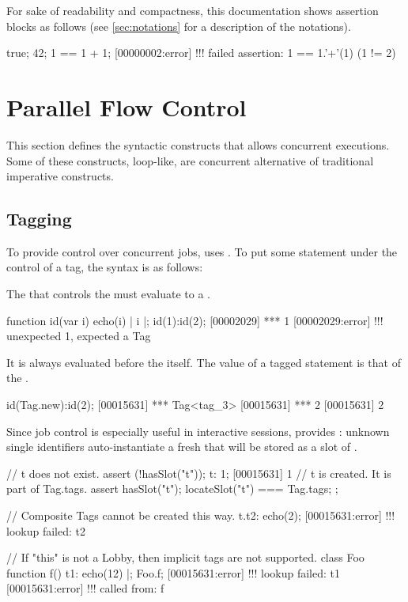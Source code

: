 For sake of readability and compactness, this documentation shows assertion
blocks as follows (see \autoref{sec:notations} for a description of the
notations).

\begin{urbiassert}
true;
42;
1 == 1 + 1;
[00000002:error] !!! failed assertion: 1 == 1.'+'(1) (1 != 2)
\end{urbiassert}


\section{Parallel Flow Control}
\label{sec:lang:conc}
This section defines the syntactic constructs that allows concurrent
executions.  Some of these constructs, loop-like, are concurrent alternative
of traditional imperative constructs.

\subsection{Tagging}
\label{sec:lang:tag}
To provide control over concurrent jobs, \us uses .  To
put some statement under the control of a tag, the syntax is as follows:


The  that controls the  must evaluate to a
.

\begin{urbiscript}
function id(var i) { echo(i) | i }|;
id(1):id(2);
[00002029] *** 1
[00002029:error] !!! unexpected 1, expected a Tag
\end{urbiscript}

It is always evaluated before the  itself.  The value of a
tagged statement is that of the .
\begin{urbiscript}
id(Tag.new):id(2);
[00015631] *** Tag<tag_3>
[00015631] *** 2
[00015631] 2
\end{urbiscript}

Since job control is especially useful in interactive sessions, \us provides
: unknown single identifiers auto-instantiate a fresh
 that will be stored as a slot of .

\begin{urbiscript}
// t does not exist.
assert (!hasSlot("t"));
t: 1;
[00015631] 1
// t is created.  It is part of Tag.tags.
assert
{
  hasSlot("t");
  locateSlot("t") === Tag.tags;
};

// Composite Tags cannot be created this way.
t.t2: echo(2);
[00015631:error] !!! lookup failed: t2

// If "this" is not a Lobby, then implicit tags are not supported.
class Foo { function f() { t1: echo(12) } }|;
Foo.f;
[00015631:error] !!! lookup failed: t1
[00015631:error] !!!    called from: f
\end{urbiscript}


